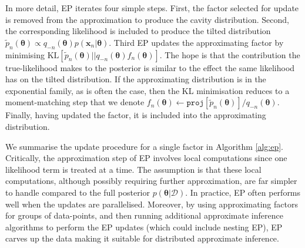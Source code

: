 In more detail, EP iterates four simple steps. First, the factor selected for update is removed from the approximation to produce the cavity distribution. Second, the corresponding likelihood is included to produce the tilted distribution $\tilde{p}_n(\bm{\theta}) \propto q_{-n}(\bm{\theta}) p(\bm{x}_n | \bm{\theta})$. Third EP updates the approximating factor by minimising $\mathrm{KL}[\tilde{p}_n(\bm{\theta}) || q_{-n}(\bm{\theta})  f_n(\bm{\theta})]$. The hope is that the contribution the true-likelihood makes to the posterior is similar to the effect the same likelihood has on the tilted distribution. If the approximating distribution is in the exponential family, as is often the case, then the KL minimisation reduces to a moment-matching step \cite{amari:ig} that we denote $f_n(\bm{\theta}) \leftarrow \mathtt{proj}[\tilde{p}_n(\bm{\theta})] / q_{-n}(\bm{\theta}) $. Finally, having updated the factor, it is included into the approximating distribution.
%
%
%
%
%

We summarise the update procedure for a single factor in Algorithm \ref{alg:ep}. Critically, the approximation step of EP involves local computations since one likelihood term is treated at a time. The assumption is that these local computations, although possibly requiring further approximation, are far simpler to handle compared to the full posterior $p(\bm{\theta}| \mathcal{D})$. In practice, EP often performs well when the updates are parallelised. Moreover, by using approximating factors for groups of data-points, and then running additional approximate inference algorithms to perform the EP updates (which could include nesting EP), EP carves up the data making it suitable for distributed approximate inference.

